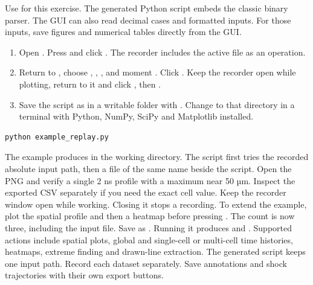 Use  for this exercise. The generated Python script embeds the classic binary parser. The GUI can also read decimal cases and formatted inputs. For those inputs, save figures and numerical tables directly from the GUI.
\begin{enumerate}
\item Open . Press  and click . The recorder includes the active file as an operation.
\item Return to , choose , , ,  and moment . Click . Keep the recorder open while plotting, return to it and click , then .
\item Save the script as  in a writable folder with . Change to that directory in a terminal with Python, NumPy, SciPy and Matplotlib installed.
\end{enumerate}
\begin{verbatim}
python example_replay.py
\end{verbatim}
The example produces  in the working directory. The script first tries the recorded absolute input path, then a file of the same name beside the script. Open the PNG and verify a single 2 ns profile with a maximum near 50 µm. Inspect the exported CSV separately if you need the exact cell value.
Keep the recorder window open while working. Closing it stops a recording. To extend the example, plot the spatial profile and then a  heatmap before pressing . The count is now three, including the input file. Save as . Running it produces  and .
Supported actions include spatial plots, global and single-cell or multi-cell time histories, heatmaps, extreme finding and drawn-line extraction. The generated script keeps one input path. Record each dataset separately. Save annotations and shock trajectories with their own export buttons.

